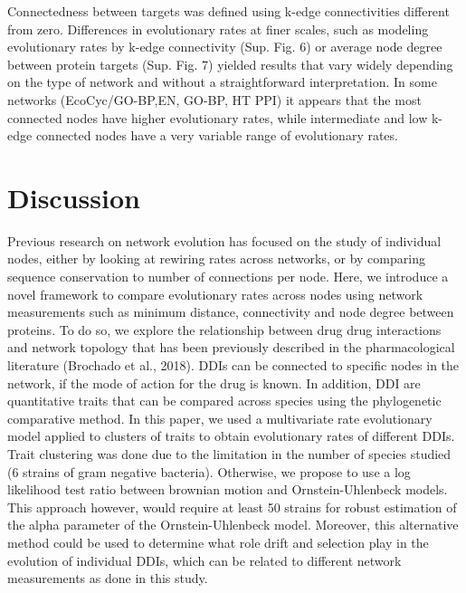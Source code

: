 \documentclass[]{elsarticle} %
\begin{document}
Connectedness between targets was defined using k-edge connectivities different from zero. Differences in evolutionary rates at finer scales, such as modeling evolutionary rates by k-edge connectivity (Sup. Fig. 6) or average node degree between protein targets (Sup. Fig. 7) yielded results that vary widely depending on the type of network and without a straightforward interpretation. In some networks (EcoCyc/GO-BP,EN, GO-BP, HT PPI) it appears that the most connected nodes have higher evolutionary rates, while intermediate and low k-edge connected nodes have a very variable range of evolutionary rates.

\hypertarget{discussion}{%
\section{Discussion}\label{discussion}}

Previous research on network evolution has focused on the study of individual nodes, either by looking at rewiring rates across networks, or by comparing sequence conservation to number of connections per node. Here, we introduce a novel framework to compare evolutionary rates across nodes using network measurements such as minimum distance, connectivity and node degree between proteins. To do so, we explore the relationship between drug drug interactions and network topology that has been previously described in the pharmacological literature (Brochado et al., 2018). DDIs can be connected to specific nodes in the network, if the mode of action for the drug is known. In addition, DDI are quantitative traits that can be compared across species using the phylogenetic comparative method. In this paper, we used a multivariate rate evolutionary model applied to clusters of traits to obtain evolutionary rates of different DDIs. Trait clustering was done due to the limitation in the number of species studied (6 strains of gram negative bacteria). Otherwise, we propose to use a log likelihood test ratio between brownian motion and Ornstein-Uhlenbeck models. This approach however, would require at least 50 strains for robust estimation of the alpha parameter of the Ornstein-Uhlenbeck model. Moreover, this alternative method could be used to determine what role drift and selection play in the evolution of individual DDIs, which can be related to different network measurements as done in this study.
\end{document}
